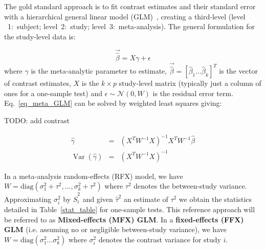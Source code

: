 \documentclass{llncs}
\DeclareMathOperator{\Var}{Var}
\newcommand{\effectvector}{\hat\beta}
\newcommand{\effect}[1][i]{\effectvector_{#1}}
\newcommand{\vareffect}[1][i]{\hat S^2_{#1}}
\newcommand{\nStudies}{k}
\newcommand{\metaanalyticeffect}{\gamma}
\newcommand{\varBetween}{\tau^2}
\newcommand{\estvarBetween}{\hat\tau^2}
\newcommand{\varWithin}[1][i]{\sigma^2_{#1}}
\newcommand{\transpose}{^T}
\begin{document}
The gold standard approach is to fit contrast estimates and their standard error with a hierarchical general linear model (GLM)~\cite{Cummings2004}, creating a third-level (level ~1:~subject; level~2:~study; level~3:~meta-analysis). The general formulation for the study-level data is:

\begin{equation}
	\vec{\effectvector} = X \metaanalyticeffect + \epsilon
	\label{eq_meta_GLM}
\end{equation}
where $\metaanalyticeffect$ is the meta-analytic parameter to estimate, $\vec{\effectvector} = [\effect[1] \ldots \effect[\nStudies] ]\transpose$ is the vector of contrast estimates, $X$ is the $k\times p$ study-level matrix (typically just a column of ones for a one-sample test) and $\epsilon \sim \mathcal{N}(0,W)$ is the residual error term. Eq.~\eqref{eq_meta_GLM} can be solved by weighted least squares giving:

TODO: add contrast

\begin{eqnarray}
	\hat \metaanalyticeffect  &=& (X\transpose W^{-1} X)^{-1} X\transpose W^{-1} \effectvector \\
	\Var(\hat \metaanalyticeffect)  &=& (X\transpose W^{-1} X)^{-1}
	\label{eq_WLS}
\end{eqnarray}

In a meta-analysis random-effects (RFX) model, we have $W = \mathrm{diag}( \varWithin[1] + \varBetween, \ldots ,\varWithin[\nStudies] + \varBetween )$ where $\varBetween$ denotes the between-study variance. Approximating $\varWithin$ by $\vareffect$ and given $\estvarBetween$ an estimate of $\varBetween$ we obtain the statistics detailed in Table~\ref{stat_table} for one-sample tests. This reference approach will be referred to as \textbf{Mixed-effects (MFX) GLM}.
In a \textbf{fixed-effects (FFX) GLM} (i.e. assuming no or negligible between-study variance), we have $W = \mathrm{diag}( \varWithin[1] \ldots \varWithin[\nStudies] )$ where $\varWithin$ denotes the contrast variance for study $i$. 
\end{document}
